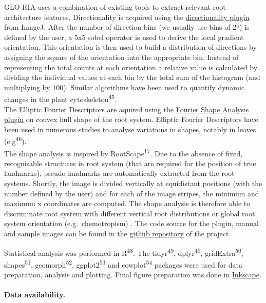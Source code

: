 \documentclass[]{article}
\begin{document}
GLO-RIA uses a combination of existing tools to extract relevant root
architecture features. Directionality is acquired using the
\href{http://fiji.sc/Directionality}{directionality plugin} from ImageJ.
After the number of direction bins (we usually use bins of 2º) is
defined by the user, a 5x5 sobel operator is used to derive the local
gradient orientation. This orientation is then used to build a
distribution of directions by assigning the square of the orientation
into the appropriate bin. Instead of representing the total counts at
each orientation a relative value is calculated by dividing the
individual values at each bin by the total sum of the histogram (and
multiplying by 100). Similar algorithms have been used to quantify
dynamic changes in the plant cytoskeleton\textsuperscript{45}.\\The
Elliptic Fourier Descriptors are aquired using the
\href{http://imagejdocu.tudor.lu/doku.php?id=plugin:analysis:fourier_shape_analysis:start}{Fourier
Shape Analysis plugin} on convex hull shape of the root system. Elliptic
Fourier Descriptors have been used in numerous studies to analyse
variations in shapes, notably in leaves (e.g\textsuperscript{46}).\\The
shape analysis is inspired by RootScape\textsuperscript{17}. Due to the
absence of fixed, recognisable structures in root system (that are
required for the position of true landmarks), pseudo-landmarks are
automatically extracted from the root systems. Shortly, the image is
divided vertically at equidistant positions (with the number defined by
the user) and for each of the image stripes, the minimum and maximum x
coordinates are computed. The shape analysis is therefore able to
discriminate root system with different vertical root distributions or
global root system orientation (e.g.~chemotropism) . The code source for
the plugin, manual and sample images can be found in the
\href{https://github.com/rr-lab/GLO-Roots/tree/master/gloria}{github
repository} of the project.

Statistical analysis was performed in R\textsuperscript{48}. The
tidyr\textsuperscript{49}, dplyr\textsuperscript{49},
gridExtra\textsuperscript{50}, shapes\textsuperscript{51},
geomorph\textsuperscript{52}, ggplot2\textsuperscript{53} and
cowplot\textsuperscript{54} packages were used for data preparation,
analysis and plotting. Final figure preparation was done in
\href{https://inkscape.org/en/}{Inkscape}.

\paragraph{Data availability.}\label{data-availability.}
\end{document}
